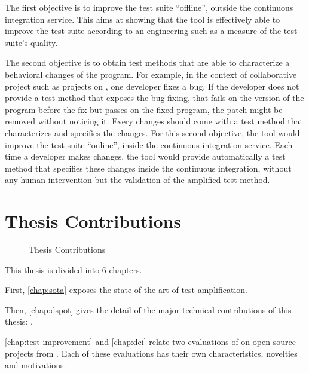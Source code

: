 The first objective is to improve the test suite ``offline'', \ie outside the continuous integration service.
This aims at showing that the tool is effectively able to improve the test suite according to an engineering such as a measure of the test suite's quality.

The second objective is to obtain test methods that are able to characterize a behavioral changes of the program.
For example, in the context of collaborative project such as projects on \gh, one developer fixes a bug.
If the developer does not provide a test method that exposes the bug fixing, \ie that fails on the version of the program before the fix but passes on the fixed program, the patch might be removed without noticing it.
Every changes should come with a test method that characterizes and specifies the changes.
For this second objective, the tool would improve the test suite ``online'', \ie inside the continuous integration service.
Each time a developer makes changes, the tool would provide automatically a test method that specifies these changes inside the continuous integration, without any human intervention but the validation of the amplified test method.

\section{Thesis Contributions}
\label{sec:intro:contributions}

\begin{figure}[h]
	\centering
	\caption{Thesis Contributions}
	\label{fig:intro:roadmap}
\end{figure}

This thesis is divided into 6 chapters.

First, \autoref{chap:sota} exposes the state of the art of test amplification.

Then, \autoref{chap:dspot} gives the detail of the major technical contributions of this thesis: \dspot.

\autoref{chap:test-improvement} and \autoref{chap:dci} relate two evaluations of \dspot on open-source projects from \gh.
Each of these evaluations has their own characteristics, novelties and motivations.

